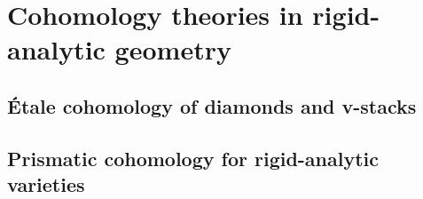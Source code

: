 \section{Cohomology theories in rigid-analytic geometry}
    \subsection{\'Etale cohomology of diamonds and v-stacks}

    \subsection{Prismatic cohomology for rigid-analytic varieties}